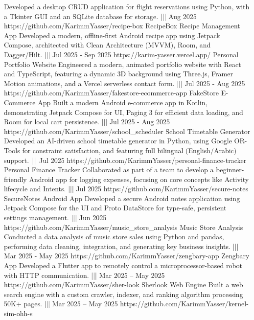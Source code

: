 {    {Developed a desktop CRUD application for flight reservations using Python, with a Tkinter GUI and an SQLite database for storage.}%
    |||
    {Aug 2025}%
    {https://github.com/KarimmYasser/recipe-box}%
    {RecipeBox Recipe Management App}%
    {Developed a modern, offline-first Android recipe app using Jetpack Compose, architected with Clean Architecture (MVVM), Room, and Dagger/Hilt.}%
    |||
    {Jul 2025 - Sep 2025}%
    {https://karim-yasser.vercel.app/}%
    {Personal Portfolio Website}%
    {Engineered a modern, animated portfolio website with React and TypeScript, featuring a dynamic 3D background using Three.js, Framer Motion animations, and a Vercel serverless contact form.}%
    |||
    {Jul 2025 - Aug 2025}%
    {https://github.com/KarimmYasser/fakestore-ecommerce-app}%
    {FakeStore E-Commerce App}%
    {Built a modern Android e-commerce app in Kotlin, demonstrating Jetpack Compose for UI, Paging 3 for efficient data loading, and Room for local cart persistence.}%
    |||
    {Jul 2025 - Aug 2025}%
    {https://github.com/KarimmYasser/school_scheduler}%
    {School Timetable Generator}%
    {Developed an AI-driven school timetable generator in Python, using Google OR-Tools for constraint satisfaction, and featuring full bilingual (English/Arabic) support.}%
    |||
    {Jul 2025}%
    {https://github.com/KarimmYasser/personal-finance-tracker}%
    {Personal Finance Tracker}%
    {Collaborated as part of a team to develop a beginner-friendly Android app for logging expenses, focusing on core concepts like Activity lifecycle and Intents.}%
    |||
    {Jul 2025}%
    {https://github.com/KarimmYasser/secure-notes}%
    {SecureNotes Android App}%
    {Developed a secure Android notes application using Jetpack Compose for the UI and Proto DataStore for type-safe, persistent settings management.}%
    |||
    {Jun 2025}%
    {https://github.com/KarimmYasser/music_store_analysis}%
    {Music Store Analysis}%
    {Conducted a data analysis of music store sales using Python and pandas, performing data cleaning, integration, and generating key business insights.}%
    |||
    {Mar 2025 - May 2025}%
    {https://github.com/KarimmYasser/zengbary-app}%
    {Zengbary App}%
    {Developed a Flutter app to remotely control a microprocessor-based robot with HTTP communication.}%
    |||
    {Mar 2025 – May 2025}%
    {https://github.com/KarimmYasser/sher-look}%
    {Sherlook Web Engine}%
    {Built a web search engine with a custom crawler, indexer, and ranking algorithm processing 50K+ pages.}%
    |||
    {Mar 2025 – May 2025}%
    {https://github.com/KarimmYasser/kernel-sim-ohh-s}%
}
